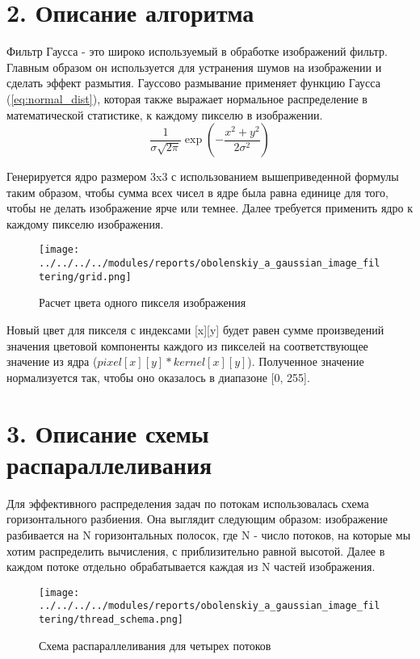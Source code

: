 \documentclass{report}
\begin{document}
    \newpage
    \section*{2. Описание алгоритма}

    \par Фильтр Гаусса - это широко используемый в обработке изображений фильтр. Главным образом он используется для устранения шумов на изображении и сделать эффект размытия. Гауссово размывание применяет функцию Гаусса (\ref{eq:normal_dist}), которая также выражает нормальное распределение в математической статистике, к каждому пикселю в изображении.
    \begin{equation}
        \label{eq:normal_dist}
        \frac{1}{\sigma\sqrt{2\pi}}\exp\left(-\frac{x^2 + y^2}{2\sigma^2}\right)
    \end{equation}
    \par Генерируется ядро размером 3x3 с использованием вышеприведенной формулы таким образом, чтобы сумма всех чисел в ядре была равна единице для того, чтобы не делать изображение ярче или темнее. Далее требуется применить ядро к каждому пикселю изображения.
    \begin{figure}[htbp]
        \centering
        \texttt{[image: ../../../../modules/reports/obolenskiy\_a\_gaussian\_image\_filtering/grid.png]}
        \caption{Расчет цвета одного пикселя изображения}
    \end{figure}
    \par Новый цвет для пикселя с индексами [x][y] будет равен сумме произведений значения цветовой компоненты каждого из пикселей на соответствующее значение из ядра ($pixel[x][y] * kernel[x][y]$). Полученное значение нормализуется так, чтобы оно оказалось в диапазоне [0, 255].


    \newpage
    \section*{3. Описание схемы распараллеливания}

    \par Для эффективного распределения задач по потокам использовалась схема горизонтального разбиения. Она выглядит следующим образом: изображение разбивается на N горизонтальных полосок, где N - число потоков, на которые мы хотим распределить вычисления, с приблизительно равной высотой. Далее в каждом потоке отдельно обрабатывается каждая из N частей изображения.
    \begin{figure}[htbp]
        \centering
        \texttt{[image: ../../../../modules/reports/obolenskiy\_a\_gaussian\_image\_filtering/thread\_schema.png]}
        \caption{Схема распараллеливания для четырех потоков}
    \end{figure}
\end{document}
